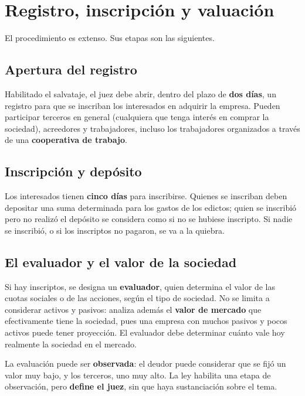 \documentclass[12pt,oneside]{book}
\begin{document}
\section{Registro, inscripción y valuación}

El procedimiento es extenso. Sus etapas son las siguientes.

\subsection{Apertura del registro}

Habilitado el salvataje, el juez debe abrir, dentro del plazo de \textbf{dos días}, un registro para que se inscriban los interesados en adquirir la empresa. Pueden participar terceros en general (cualquiera que tenga interés en comprar la sociedad), acreedores y trabajadores, incluso los trabajadores organizados a través de una \textbf{cooperativa de trabajo}.

\subsection{Inscripción y depósito}

Los interesados tienen \textbf{cinco días} para inscribirse. Quienes se inscriban deben depositar una suma determinada para los gastos de los edictos; quien se inscribió pero no realizó el depósito se considera como si no se hubiese inscripto. Si nadie se inscribió, o si los inscriptos no pagaron, se va a la quiebra.

\subsection{El evaluador y el valor de la sociedad}

Si hay inscriptos, se designa un \textbf{evaluador}, quien determina el valor de las cuotas sociales o de las acciones, según el tipo de sociedad. No se limita a considerar activos y pasivos: analiza además el \textbf{valor de mercado} que efectivamente tiene la sociedad, pues una empresa con muchos pasivos y pocos activos puede tener proyección. El evaluador debe determinar cuánto vale hoy realmente la sociedad en el mercado.


La evaluación puede ser \textbf{observada}: el deudor puede considerar que se fijó un valor muy bajo, y los terceros, uno muy alto. La ley habilita una etapa de observación, pero \textbf{define el juez}, sin que haya sustanciación sobre el tema.
\end{document}
